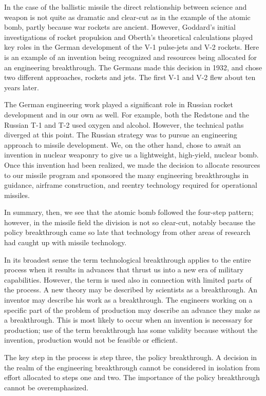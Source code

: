 In the case of the ballistic missile the direct relationship between science and weapon is not quite as dramatic and clear-cut as in the example of the atomic bomb, partly because war rockets are ancient. However, Goddard's initial investigations of rocket propulsion and Oberth's theoretical calculations played key roles in the German development of the V-1 pulse-jets and V-2 rockets. Here is an example of an invention being recognized and resources being allocated for an engineering breakthrough. The Germans made this decision in 1932, and chose two different approaches, rockets and jets. The first V-1 and V-2 flew about ten years later.

The German engineering work played a significant role in Russian rocket development and in our own as well. For example, both the Redstone and the Russian T-1 and T-2 used oxygen and alcohol. However, the technical paths diverged at this point. The Russian strategy was to pursue an engineering approach to missile development. We, on the other hand, chose to await an invention in nuclear weaponry to give us a lightweight, high-yield, nuclear bomb. Once this invention had been realized, we made the decision to allocate resources to our missile program and sponsored the many engineering breakthroughs in guidance, airframe construction, and reentry technology required for operational missiles.

In summary, then, we see that the atomic bomb followed the four-step pattern; however, in the missile field the division is not so clear-cut, notably because the policy breakthrough came so late that technology from other areas of research had caught up with missile technology.

In its broadest sense the term technological breakthrough applies to the entire process when it results in advances that thrust us into a new era of military capabilities. However, the term is used also in connection with limited parts of the process. A new theory may be described by scientists as a breakthrough. An inventor may describe his work as a breakthrough. The engineers working on a specific part of the problem of production may describe an advance they make as a breakthrough. This is most likely to occur when an invention is necessary for production; use of the term breakthrough has some validity because without the invention, production would not be feasible or efficient.

The key step in the process is step three, the policy breakthrough. A decision in the realm of the engineering breakthrough cannot be considered in isolation from effort allocated to steps one and two. The importance of the policy breakthrough cannot be overemphasized.

